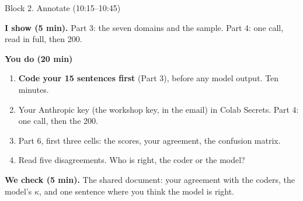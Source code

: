 \begin{frame}{Block 2. Annotate (10:15--10:45)}

\small
\textbf{I show (5 min).} Part 3: the seven domains and the sample. Part 4: one call, read in full, then 200.

\vspace{0.3cm}

\textbf{You do (20 min)}
\begin{enumerate}
    \setlength{\itemsep}{3pt}
    \item \textbf{Code your 15 sentences first} (Part 3), before any model output. Ten minutes.
    \item Your Anthropic key (the workshop key, in the email) in Colab Secrets. Part 4: one call, then the 200.
    \item Part 6, first three cells: the scores, your agreement, the confusion matrix.
    \item Read five disagreements. Who is right, the coder or the model?
\end{enumerate}

\vspace{0.3cm}

\textbf{We check (5 min).} The shared document: your agreement with the coders, the model's $\kappa$, and one sentence where you think the model is right.

\end{frame}

